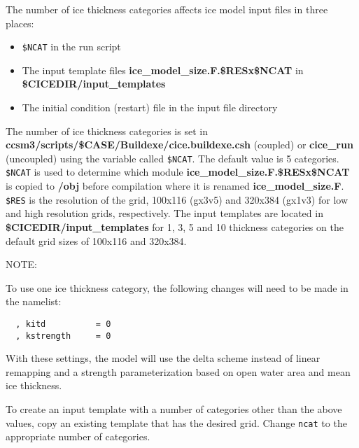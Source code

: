 
The number of ice thickness categories affects ice model input files in three
places:
  \begin{itemize}
    \item {\tt \$NCAT} in the run script
    \item The input template files {\bf ice\_model\_size.F.\$RESx\$NCAT}
    in {\bf \$CICEDIR/input\_templates}
    \item The initial condition (restart) file in the input file directory
  \end{itemize}

The number of ice thickness categories is set in 
{\bf ccsm3/scripts/\$CASE/Buildexe/cice.buildexe.csh} (coupled) or
{\bf cice\_run} (uncoupled) using the variable called {\tt \$NCAT}.  The
default value is 5 categories. {\tt \$NCAT} is used to determine which module
{\bf ice\_model\_size.F.\$RESx\$NCAT} is copied to {\bf /obj} before
compilation where it is renamed {\bf ice\_model\_size.F}.  {\tt \$RES} is the
resolution of the grid, 100x116 (gx3v5) and 320x384 (gx1v3) for low and
high resolution grids, respectively.  The input templates
are located in {\bf \$CICEDIR/input\_templates} for 1, 3, 5 and 10
thickness categories on the default grid sizes of 100x116 and 320x384.

\begin{Ventry}{NOTE:}
\item[NOTE]
To use one ice thickness category, the following changes will need to be
made in the namelist: \\

\begin{verbatim}
  , kitd          = 0
  , kstrength     = 0
\end{verbatim}

With these settings, the model will use the delta scheme instead of linear
remapping and a strength parameterization based on open water area and
mean ice thickness.

\end{Ventry}

To create an input template with a number of categories other than the above
values, copy an existing template that has the desired grid. Change {\tt ncat}
to the appropriate number of categories. 

